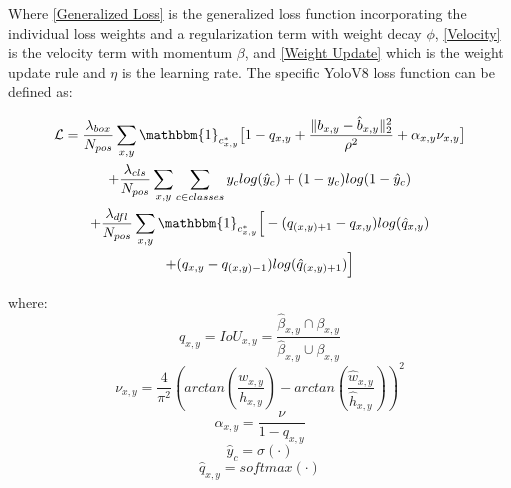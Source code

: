 \documentclass[10pt,twocolumn,letterpaper]{article}
\begin{document}
Where \ref{Generalized Loss} is the generalized loss function incorporating the individual loss weights and a regularization term with weight decay $\phi$, \ref{Velocity} is the velocity term with momentum $\beta$, and \ref{Weight Update} which is the weight update rule and $\eta$ is the learning rate. The specific YoloV8 loss function can be defined as:

\begin{multline}
\mathcal{L} = \dfrac{\lambda_{box}}{N_{pos}}\sum_{x,y}\mathbbm{1}_{c^*_{x,y}}\big[1 - q_{x,y} + \dfrac{\Vert b_{x,y} - \hat{b}_{x,y} \Vert_2^2}{\rho^2} + \alpha_{x,y}\nu_{x,y}\big] \\  + \dfrac{\lambda_{cls}}{N_{pos}}\sum_{x,y}\sum_{c\in classes}y_clog(\hat{y}_c) + (1 - y_c)log(1 - \hat{y}_c) \\
+ \dfrac{\lambda_{dfl}}{N_{pos}}\sum_{x,y}\mathbbm{1}_{c^*_{x,y}}\Big[-(q_{(x,y)+1} - q_{x,y})log(\hat{q}_{x,y}) \\
+ (q_{x,y} - q_{(x,y)-1})log(\hat{q}_{(x,y)+1})\Big]
\end{multline}

where:
\begin{equation*}\label{IoU}
q_{x,y} = IoU_{x,y} = \dfrac{\hat{\beta}_{x,y}\displaystyle \cap\beta_{x,y}}{\hat{\beta}_{x,y}\displaystyle \cup\beta_{x,y}}
\end{equation*}
\begin{equation*}\label{v}
\nu_{x,y} = \dfrac{4}{\pi^2}(arctan(\dfrac{w_{x,y}}{h_{x,y}}) - arctan(\dfrac{\hat{w}_{x,y}}{\hat{h}_{x,y}}))^2
\end{equation*}
\begin{equation*}\label{a}
\alpha_{x,y} = \dfrac{\nu}{1 - q_{x,y}}
\end{equation*}
\begin{equation*}\label{y_hat}
\hat{y}_c = \sigma({\cdot})
\end{equation*}
\begin{equation*}\label{q_hat}
\hat{q}_{x,y} = softmax({\cdot})
\end{equation*}
    
\end{document}
